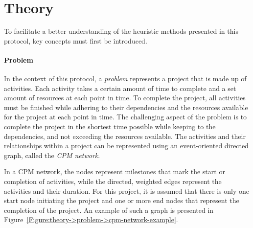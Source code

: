 \section{Theory}\label{Section:theory}
To facilitate a better understanding of the heuristic methods presented in this protocol, key concepts must first be introduced.

\paragraph{Problem}
In the context of this protocol, a \textit{problem} represents a project that is made up of activities.
Each activity takes a certain amount of time to complete and a set amount of resources at each point in time.
To complete the project, all activities must be finished while adhering to their dependencies and the resources available for the project at each point in time.
The challenging aspect of the problem is to complete the project in the shortest time possible while keeping to the dependencies, and not exceeding the resources available. The activities and their relationships within a project can be represented using an event-oriented directed graph, called the \textit{CPM network}.

In a CPM network, the nodes represent milestones that mark the start or completion of activities, while the directed, weighted edges represent the activities and their duration.
For this project, it is assumed that there is only one start node initiating the project and one or more end nodes that represent the completion of the project.
An example of such a graph is presented in Figure~\ref{Figure:theory->problem->cpm-network-example}.

